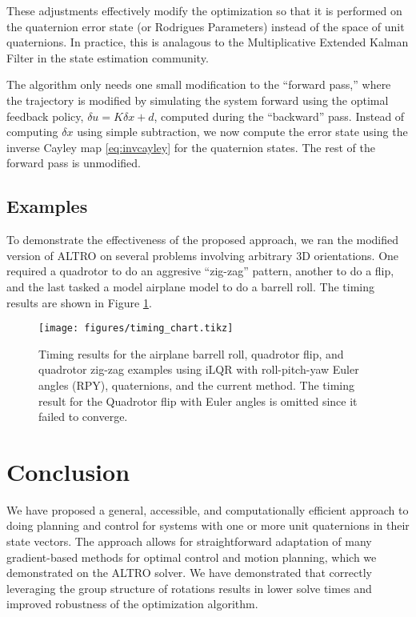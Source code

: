 \documentclass[letterpaper, 10 pt, conference]{ieeeconf}  %
\begin{document}
    These adjustments effectively modify the optimization so that it is performed on the
    quaternion error state (or Rodrigues Parameters) instead of the space of unit
    quaternions. In practice, this is analagous to the Multiplicative Extended Kalman
    Filter \cite{markley2014fundamentals} in the state estimation community.

    The algorithm only needs one small modification to the ``forward pass,'' where the
    trajectory is modified by simulating the system forward using the optimal feedback
    policy, $\delta u = K \delta x + d$, computed during the ``backward'' pass. Instead of 
    computing $\delta x$ using simple subtraction, we now compute the error state using the
    inverse Cayley map \eqref{eq:invcayley} for the quaternion states. The rest of the
    forward pass is unmodified.

    \subsection{Examples}
        To demonstrate the effectiveness of the proposed approach, we ran the modified
        version of ALTRO on several problems involving arbitrary 3D orientations. One 
        required a quadrotor to do an aggresive ``zig-zag'' pattern, another to do a flip,
        and the last tasked a model airplane model to do a barrell roll. The timing results
        are shown in Figure \ref{fig:timing_chart}.
        \begin{figure}
            \centering
            \texttt{[image: figures/timing\_chart.tikz]}
            \caption{Timing results for the airplane barrell roll, quadrotor flip, and
            quadrotor zig-zag examples using iLQR with roll-pitch-yaw Euler angles (RPY),
            quaternions, and the current method. The timing result for the Quadrotor flip
            with Euler angles is omitted since it failed to converge.
            }
            \label{fig:timing_chart}
        \end{figure}

\section{Conclusion} 

    We have proposed a general, accessible, and computationally efficient approach to
    doing planning and control for systems with one or more unit quaternions in their
    state vectors. The approach allows for straightforward adaptation of many
    gradient-based methods for optimal control and motion planning, which we demonstrated
    on the ALTRO solver. We have demonstrated that correctly leveraging the group
    structure of rotations results in lower solve times and improved robustness of the
    optimization algorithm.
\end{document}
